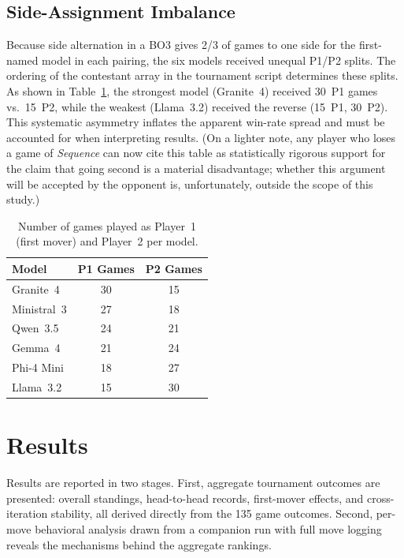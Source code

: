 \documentclass[11pt]{article}
\begin{document}
\subsection{Side-Assignment Imbalance}

Because side alternation in a BO3 gives 2/3 of games to one side for the first-named model in each pairing, the six models received unequal P1/P2 splits. The ordering of the contestant array in the tournament script determines these splits. As shown in Table~\ref{tab:side_split}, the strongest model (Granite~4) received 30~P1 games vs.\ 15~P2, while the weakest (Llama~3.2) received the reverse (15~P1, 30~P2). This systematic asymmetry inflates the apparent win-rate spread and must be accounted for when interpreting results. (On a lighter note, any player who loses a game of \textit{Sequence} can now cite this table as statistically rigorous support for the claim that going second is a material disadvantage; whether this argument will be accepted by the opponent is, unfortunately, outside the scope of this study.)

\begin{table}[H]
\centering
\caption{Number of games played as Player~1 (first mover) and Player~2 per model.}
\label{tab:side_split}
\begin{tabular}{lcc}
\toprule
\textbf{Model} & \textbf{P1 Games} & \textbf{P2 Games} \\
\midrule
Granite~4   & 30 & 15 \\
Ministral~3 & 27 & 18 \\
Qwen~3.5    & 24 & 21 \\
Gemma~4     & 21 & 24 \\
Phi-4 Mini  & 18 & 27 \\
Llama~3.2   & 15 & 30 \\
\bottomrule
\end{tabular}
\end{table}

\section{Results}
\label{sec:results}

Results are reported in two stages. First, aggregate tournament outcomes are presented: overall standings, head-to-head records, first-mover effects, and cross-iteration stability, all derived directly from the 135 game outcomes. Second, per-move behavioral analysis drawn from a companion run with full move logging reveals the mechanisms behind the aggregate rankings.
\end{document}
